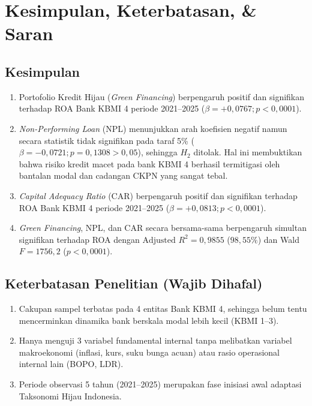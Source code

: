 \documentclass[11pt,a4paper]{article}
\begin{document}
\section{Kesimpulan, Keterbatasan, \& Saran}

\subsection{Kesimpulan}
\begin{enumerate}
    \item Portofolio Kredit Hijau (\textit{Green Financing}) berpengaruh positif dan signifikan terhadap ROA Bank KBMI 4 periode 2021--2025 ($\beta = +0{,}0767; p < 0{,}0001$).
    \item \textit{Non-Performing Loan} (NPL) menunjukkan arah koefisien negatif namun secara statistik tidak signifikan pada taraf 5\% ($\beta = -0{,}0721; p = 0{,}1308 > 0{,}05$), sehingga $H_2$ ditolak. Hal ini membuktikan bahwa risiko kredit macet pada bank KBMI 4 berhasil termitigasi oleh bantalan modal dan cadangan CKPN yang sangat tebal.
    \item \textit{Capital Adequacy Ratio} (CAR) berpengaruh positif dan signifikan terhadap ROA Bank KBMI 4 periode 2021--2025 ($\beta = +0{,}0813; p < 0{,}0001$).
    \item \textit{Green Financing}, NPL, dan CAR secara bersama-sama berpengaruh simultan signifikan terhadap ROA dengan $\text{Adjusted } R^2 = 0{,}9855$ ($98{,}55\%$) dan Wald $F = 1756{,}2$ ($p < 0{,}0001$).
\end{enumerate}

\subsection{Keterbatasan Penelitian (Wajib Dihafal)}
\begin{enumerate}
    \item Cakupan sampel terbatas pada 4 entitas Bank KBMI 4, sehingga belum tentu mencerminkan dinamika bank berskala modal lebih kecil (KBMI 1--3).
    \item Hanya menguji 3 variabel fundamental internal tanpa melibatkan variabel makroekonomi (inflasi, kurs, suku bunga acuan) atau rasio operasional internal lain (BOPO, LDR).
    \item Periode observasi 5 tahun (2021--2025) merupakan fase inisiasi awal adaptasi Taksonomi Hijau Indonesia.
\end{enumerate}
\end{document}
